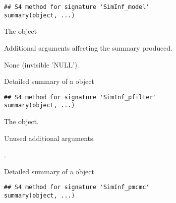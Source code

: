 \documentclass[letterpaper]{book}
\begin{document}
%
\begin{Usage}
\begin{verbatim}
## S4 method for signature 'SimInf_model'
summary(object, ...)
\end{verbatim}
\end{Usage}
%
\begin{Arguments}
\begin{ldescription}
\item[\code{object}] The  object

\item[\code{...}] Additional arguments affecting the summary produced.
\end{ldescription}
\end{Arguments}
%
\begin{Value}
None (invisible 'NULL').
\end{Value}
%
\begin{Description}
Detailed summary of a  object
\end{Description}
%
\begin{Usage}
\begin{verbatim}
## S4 method for signature 'SimInf_pfilter'
summary(object, ...)
\end{verbatim}
\end{Usage}
%
\begin{Arguments}
\begin{ldescription}
\item[\code{object}] The  object.

\item[\code{...}] Unused additional arguments.
\end{ldescription}
\end{Arguments}
%
\begin{Value}
.
\end{Value}
%
\begin{Description}
Detailed summary of a  object
\end{Description}
%
\begin{Usage}
\begin{verbatim}
## S4 method for signature 'SimInf_pmcmc'
summary(object, ...)
\end{verbatim}
\end{Usage}
\end{document}
